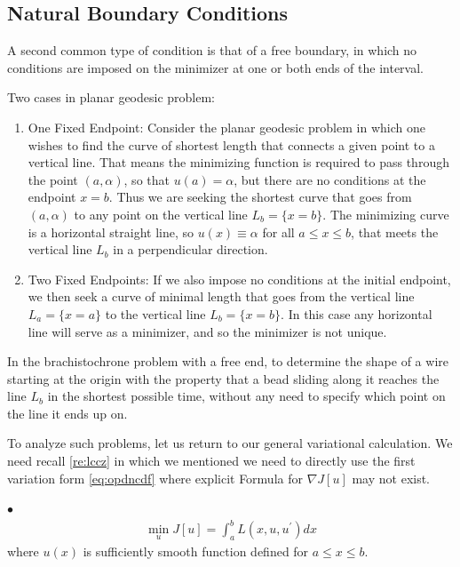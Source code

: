 \documentclass{article}
\begin{document}
\subsection{Natural Boundary Conditions}
A second common type of condition is that of a free boundary, in which no conditions are imposed on the minimizer at one or both ends of the interval.
\begin{exma}Two cases in planar geodesic problem:
\begin{enumerate}
    \item One Fixed Endpoint: Consider the planar geodesic problem in which one wishes to find the curve of shortest length that connects a given point to a vertical line. That means the minimizing function is required to pass through the point $(a, \alpha)$, so that $u(a)=\alpha$, but there are no conditions at the endpoint $x=b$. Thus we are seeking the shortest curve that goes from $(a, \alpha)$ to any point on the vertical line $L_{b}=\{x=b\} .$ The minimizing curve is a horizontal straight line, so $u(x) \equiv \alpha$ for all $a \leq x \leq b$, that meets the vertical line $L_{b}$ in a perpendicular direction. 
    \item Two Fixed Endpoints: If we also impose no conditions at the initial endpoint, we then seek a curve of minimal length that goes from the vertical line $L_{a}=\{x=a\}$ to the vertical line $L_{b}=\{x=b\} .$ In this case any horizontal line will serve as a minimizer, and so the minimizer is not unique.
\end{enumerate}
\end{exma}
\begin{exma}\label{exm:bra}
In the brachistochrone problem with a free end, to determine the shape of a wire starting at the origin with the property that a bead sliding along it reaches the line $L_{b}$ in the shortest possible time, without any need to specify which point on the line it ends up on. 
\end{exma}

To analyze such problems, let us return to our general variational calculation. We need recall \cref{re:lccz} in which we mentioned we need to directly use the first variation form \cref{eq:opdncdf} where {explicit Formula} for $\nabla J[u]$ may not exist. 

$\bullet$ 
\begin{align*}
\min_{u} J[u]=\int_{a}^{b} L\left(x, u, u^{\prime}\right) d x
\end{align*}
where $u(x)$ is sufficiently smooth function defined for $a \leq x \leq b$.
\end{document}
